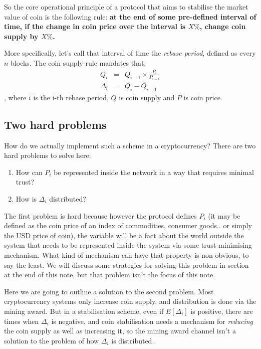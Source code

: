 \documentclass[twocolumn]{article}
\begin{document}
So the core operational principle of a protocol that aims to stabilise
the market value of coin is the following rule: \textbf{at the end of
  some pre-defined interval of time, if the change in coin price over
  the interval is $X\%$, change coin supply by $X\%$.}

More specifically, let's call that interval of time the \emph{rebase
  period}, defined as every $n$ blocks. The coin supply rule mandates
that:
\begin{eqnarray}
Q_{i} &=& Q_{i-1}\times \frac{P_{i}}{P_{i-1}}\label{eqn:supply}\\
\Delta_{i} &=& Q_{i} - Q_{i-1}\label{eqn:delta}
\end{eqnarray},
where $i$ is the i-th rebase period, $Q$ is coin supply and $P$ is
coin price. 

\subsection*{Two hard problems}
How do we actually implement such a scheme in a cryptocurrency? There
are two hard problems to solve here:
\begin{enumerate}
\item How can $P_{i}$ be represented inside the network in a way that
  requires minimal trust?
\item How is $\Delta_{i}$ distributed? 
\end{enumerate}
The first problem is hard because however the protocol defines $P_{i}$
(it may be defined as the coin price of an index of commodities,
consumer goods.. or simply the USD price of coin), the variable will
be a fact about the world outside the system that needs to be
represented inside the system via some trust-minimising
mechanism. What kind of mechanism can have that property is
non-obvious, to say the least. We will discuss some strategies for
solving this problem in section at the end of this note, but that
problem isn't the focus of this note.

Here we are going to outline a solution to the second problem. Most
cryptocurrency systems only increase coin supply, and distribution is
done via the mining award. But in a stabilisation scheme, even if
$E[\Delta_{i}]$ is positive, there are times when $\Delta_{i}$ is
negative, and coin stabilisation needs a mechanism for \emph{reducing}
the coin supply as well as increasing it, so the mining award channel
isn't a solution to the problem of how $\Delta_{i}$ is distributed.
\end{document}
